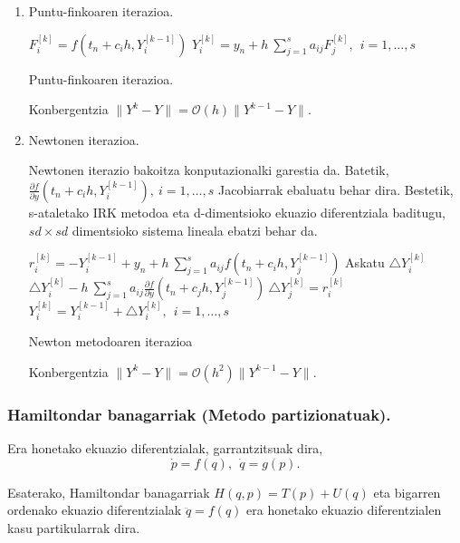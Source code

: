 \begin{enumerate}

\item Puntu-finkoaren iterazioa.

\begin{algorithm}[H]
  {
   $F_{i}^{[k]}=f(t_n+c_ih,Y_i^{[k-1]})$\;
   $Y_{i}^{[k]}=y_{n}+ h \ \sum\limits_{j=1}^{s} a_{ij} F_{j}^{[k]} , \ \  i=1,\dots,s$\; 
  }
 \caption{Puntu-finkoaren iterazioa.}
 \label{alg:rkpf}
\end{algorithm}

Konbergentzia $\|Y^k-Y\|=\mathcal{O}(h) \|Y^{k-1}-Y\|$.


\item Newtonen iterazioa. 

Newtonen iterazio bakoitza konputazionalki garestia da. Batetik,  $\frac{\partial f}{\partial y}(t_n+c_ih,Y_i^{[k-1]}), \ i=1,\dots,s$ Jacobiarrak ebaluatu behar dira. Bestetik, s-ataletako IRK metodoa eta  d-dimentsioko ekuazio diferentziala baditugu, $sd \times sd$ dimentsioko sistema lineala ebatzi behar da.    

\begin{algorithm}[H]
  {
   $r_{i}^{[k]}=-Y_i^{[k-1]}+y_n+h \ \sum\limits_{j=1}^{s} a_{ij} f(t_n+c_ih,Y_j^{[k-1]}) $\;
   Askatu $\triangle Y_i^{[k]}$\;
   $\triangle Y_i^{[k]}-h \ \sum\limits_{j=1}^{s} a_{ij} \frac{\partial f}{\partial y}(t_n+c_jh,Y_j^{[k-1]}) \ \triangle Y_j^{[k]}=r_i^{[k]}$\;
   $Y_i^{[k]}=Y_i^{[k-1]}+\triangle Y_i^{[k]}, \ \  i=1,\dots,s$\; 
  }
 \caption{Newton metodoaren iterazioa}
\end{algorithm}

Konbergentzia $\|Y^k-Y\|=\mathcal{O}(h^2) \|Y^{k-1}-Y\|$.

\end{enumerate}

\subsubsection*{Hamiltondar banagarriak (Metodo partizionatuak).}

Era honetako ekuazio diferentzialak, garrantzitsuak dira,
\begin{equation*}
\dot{p}=f(q), \ \ \dot{q}=g(p).
\end{equation*}

Esaterako, Hamiltondar banagarriak $H(q,p)=T(p)+U(q)$ eta bigarren ordenako ekuazio diferentzialak $\ddot{q}=f(q)$ era honetako ekuazio diferentzialen kasu partikularrak dira.

